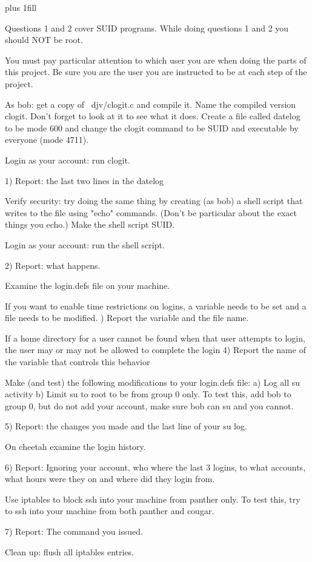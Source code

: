 
\rightskip=0pt plus 1fill

\parindent 0pt

Questions 1 and 2 cover SUID programs.
While doing questions 1 and 2 you should NOT be root.

You must pay particular attention to which user you are when
doing the parts of this project. Be sure you are the user
you are instructed to be at each step of the project.

As bob: get a copy of {\ltt{}~djv/clogit.c} and compile it.
Name the compiled version {\ltt{}clogit}.
Don't forget to look at it to see what it does.
Create a file called {\ltt{}datelog} to be mode 600 and
change the {\ltt{}clogit} command to be SUID and executable
by everyone (mode 4711).

Login as your account: run clogit.

1) Report: the last two lines in the datelog

Verify security: try doing the same thing by creating (as bob) a shell
script that writes to the file using "echo" commands.
(Don't be particular about the exact things you echo.)
Make the shell script SUID.

Login as your account: run the shell script.

2) Report: what happens.

Examine the {\ltt{}login.defs} file on your machine.

If you want to enable time restrictions on logins, a
variable needs to be set and a file needs to be modified.
\hfill{}) Report the variable and the file name.

If a home directory for a user cannot be found when that user attempts to
login, the user may or may not be allowed to complete the login
4) Report the name of the variable that controls this behavior

Make (and test) the following modifications to your {\ltt{}login.defs} file:
\hfill\break
a) Log all su activity
\hfill\break
b) Limit {\ltt{}su} to {\ltt{}root} to be from group 0 only.
To test this, add {\ltt{}bob} to group 0, but do not add your account,
make sure {\ltt{}bob} can su and you cannot.

5) Report: the changes you made and the last line of your su log.

On {\ltt{}cheetah} examine the login history.

6) Report: Ignoring your account, who where the last 3 logins, to what
accounts, what hours were they on and where did they login from.

Use iptables to block ssh into your machine from {\ltt{}panther} only.
To test this, try to ssh into your machine from both panther
and cougar.

7) Report: The command you issued.

Clean up: flush all iptables entries.
\bye
